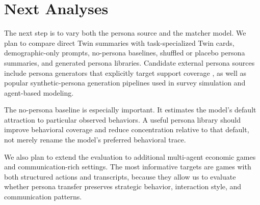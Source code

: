 \documentclass[11pt]{article}
\begin{document}
\section{Next Analyses}

The next step is to vary both the persona source and the matcher model. We plan to compare direct Twin summaries with task-specialized Twin cards, demographic-only prompts, no-persona baselines, shuffled or placebo persona summaries, and generated persona libraries. Candidate external persona sources include persona generators that explicitly target support coverage \citep{paglieri2026persona}, as well as popular synthetic-persona generation pipelines used in survey simulation and agent-based modeling.

The no-persona baseline is especially important. It estimates the model's default attraction to particular observed behaviors. A useful persona library should improve behavioral coverage and reduce concentration relative to that default, not merely rename the model's preferred behavioral trace.

We also plan to extend the evaluation to additional multi-agent economic games and communication-rich settings. The most informative targets are games with both structured actions and transcripts, because they allow us to evaluate whether persona transfer preserves strategic behavior, interaction style, and communication patterns.



\end{document}
